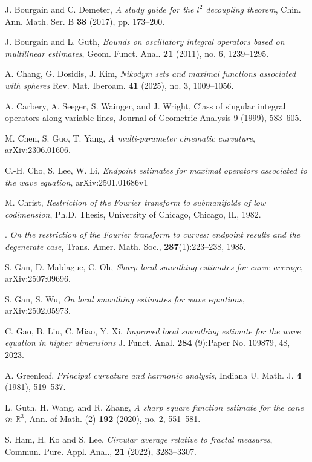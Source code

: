 \documentclass[10pt] %
{amsart}
\theoremstyle{plain}
\numberwithin{equation}{section}
\begin{document}
\begin{thebibliography}{}
 J. Bourgain and C. Demeter, \textit{A study guide for the $l^2$ decoupling theorem}, Chin.
Ann. Math. Ser. B \textbf{38} (2017), pp. 173–200.
	
 J. Bourgain and L. Guth, \textit{Bounds on oscillatory integral operators based on multilinear estimates},  Geom. Funct. Anal. \textbf{21} (2011), no. 6, 1239--1295.

 A. Chang, G. Dosidis, J. Kim, \textit{Nikodym sets and maximal functions associated with spheres} Rev. Mat. Iberoam. \textbf{41} (2025), no. 3, 1009--1056. 

 A. Carbery, A. Seeger, S. Wainger, and J. Wright, Class of singular integral operators
along variable lines, Journal of Geometric Analysis 9 (1999), 583--605.  

 M. Chen, S. Guo, T. Yang, \textit{A multi-parameter cinematic curvature},
arXiv:2306.01606.

 C.-H. Cho, S. Lee, W. Li, \textit{Endpoint estimates for maximal operators associated to the wave equation}, arXiv:2501.01686v1


 M. Christ, \textit{Restriction of the Fourier transform to submanifolds of low codimension}, Ph.D. Thesis, University of Chicago, Chicago, IL, 1982.

 \bysame.
\textit{On the restriction of the {F}ourier transform to curves: endpoint results and the degenerate case},
Trans. Amer. Math. Soc., \textbf{287}(1):223--238, 1985.


 S. Gan, D. Maldague, C. Oh, \textit{Sharp local smoothing estimates for curve average},
arXiv:2507:09696.

 S. Gan, S. Wu, \textit{On local smoothing estimates for wave equations}, arXiv:2502.05973.

 C. Gao, B. Liu, C. Miao, Y. Xi, \textit{Improved local smoothing estimate for the wave equation in higher dimensions} J. Funct. Anal. \textbf{284} (9):Paper No. 109879, 48, 2023.



 A. Greenleaf, \textit{Principal curvature and harmonic analysis}, Indiana U. Math. J. \textbf{4} (1981),  519--537.
	
 L. Guth, H. Wang, and R. Zhang, \textit{A sharp square function estimate for the cone in $\mathbb R^{3}$}, Ann. of Math. (2) \textbf{192} (2020), no. 2, 551--581.

 S. Ham, H. Ko and S. Lee, \textit{Circular average relative to fractal measures}, Commun. Pure. Appl. Anal.,
\textbf{21} (2022), 3283--3307.
	



\end{thebibliography}
\end{document}
